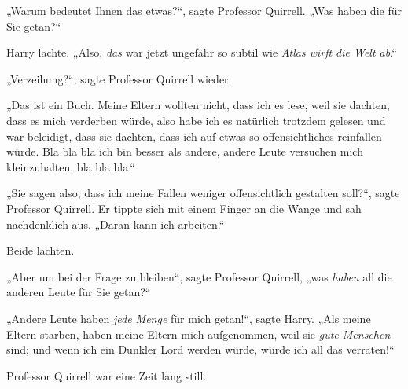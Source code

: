 „Warum bedeutet Ihnen das etwas?“, sagte Professor Quirrell. „Was haben die für Sie getan?“

Harry lachte. „Also, \emph{das} war jetzt ungefähr so subtil wie \emph{Atlas wirft die Welt ab}.“

„Verzeihung?“, sagte Professor Quirrell wieder.

„Das ist ein Buch. Meine Eltern wollten nicht, dass ich es lese, weil sie dachten, dass es mich verderben würde, also habe ich es natürlich trotzdem gelesen und war beleidigt, dass sie dachten, dass ich auf etwas so offensichtliches reinfallen würde. Bla bla bla ich bin besser als andere, andere Leute versuchen mich kleinzuhalten, bla bla bla.“

„Sie sagen also, dass ich meine Fallen weniger offensichtlich gestalten soll?“, sagte Professor Quirrell. Er tippte sich mit einem Finger an die Wange und sah nachdenklich aus. „Daran kann ich arbeiten.“

Beide lachten.

„Aber um bei der Frage zu bleiben“, sagte Professor Quirrell, „was \emph{haben} all die anderen Leute für Sie getan?“

„Andere Leute haben \emph{jede Menge} für mich getan!“, sagte Harry. „Als meine Eltern starben, haben meine Eltern mich aufgenommen, weil sie \emph{gute Menschen} sind; und wenn ich ein Dunkler Lord werden würde, würde ich all das verraten!“

Professor Quirrell war eine Zeit lang still.


